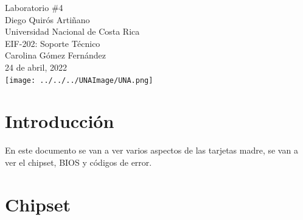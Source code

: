\documentclass[stu, 12pt, letterpaper, donotrepeattitle, floatsintext, natbib, helv]{apa7}
\begin{document}
\begin{titlepage}
    \centering
    \vfill
    \LARGE Laboratorio \#4\\
    \vskip2cm
    \large Diego Quirós Artiñano \\
    Universidad Nacional de Costa Rica \\
    EIF-202: Soporte Técnico \\ 
    Carolina Gómez Fernández \\
    24 de abril, 2022 \\
    \vfill
    \texttt{[image: ../../../UNAImage/UNA.png]} \\
    \vfill
    \vfill
\end{titlepage}

\addto{}
\tableofcontents
\setcounter{tocdepth}{2}
\newpage
\renewcommand{\listfigurename}{\largeÍndice de fíguras}
\listoffigures
\newpage
\renewcommand{\listtablename}{\largeÍndice de tablas}
\listoftables
\newpage


\section*{Introducción}
{}

En este documento se van a ver varios aspectos de las tarjetas madre, se van a ver el chipset, BIOS y códigos de error.
\section*{Chipset}
{}
\end{document}
